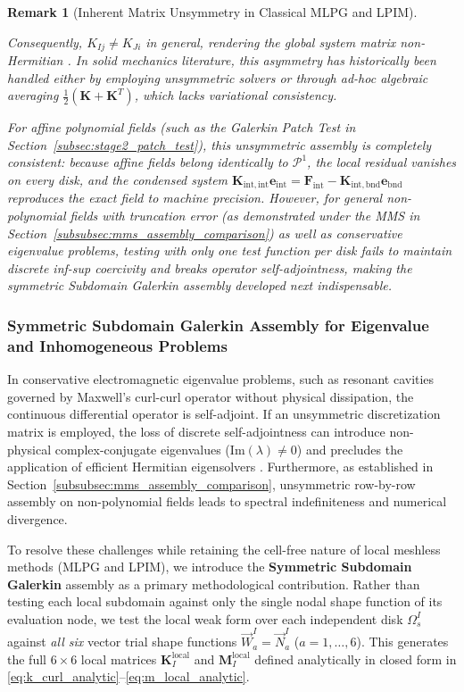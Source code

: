 \documentclass[preprint,12pt]{elsarticle}
\newtheorem{remark}{Remark}
\begin{document}
\begin{remark}[Inherent Matrix Unsymmetry in Classical MLPG and LPIM]
\begin{enumerate}
    \end{enumerate}
    Consequently, $K_{Ij} \ne K_{Ji}$ in general, rendering the global system matrix non-Hermitian \cite{atluri2002meshless, liu2001local}. In solid mechanics literature, this asymmetry has historically been handled either by employing unsymmetric solvers or through ad-hoc algebraic averaging $\frac{1}{2}(\mathbf{K} + \mathbf{K}^T)$, which lacks variational consistency.

    For affine polynomial fields (such as the Galerkin Patch Test in Section~\ref{subsec:stage2_patch_test}), this unsymmetric assembly is completely consistent: because affine fields belong identically to $\mathcal{P}^1$, the local residual vanishes on every disk, and the condensed system $\mathbf{K}_{\mathrm{int}, \mathrm{int}} \mathbf{e}_{\mathrm{int}} = \mathbf{F}_{\mathrm{int}} - \mathbf{K}_{\mathrm{int}, \mathrm{bnd}} \mathbf{e}_{\mathrm{bnd}}$ reproduces the exact field to machine precision. However, for general non-polynomial fields with truncation error (as demonstrated under the MMS in Section~\ref{subsubsec:mms_assembly_comparison}) as well as conservative eigenvalue problems, testing with only one test function per disk fails to maintain discrete inf-sup coercivity and breaks operator self-adjointness, making the symmetric Subdomain Galerkin assembly developed next indispensable.
\end{remark}

\subsubsection{Symmetric Subdomain Galerkin Assembly for Eigenvalue and Inhomogeneous Problems}
\label{subsubsec:symmetric_assembly}

In conservative electromagnetic eigenvalue problems, such as resonant cavities governed by Maxwell's curl-curl operator without physical dissipation, the continuous differential operator is self-adjoint. If an unsymmetric discretization matrix is employed, the loss of discrete self-adjointness can introduce non-physical complex-conjugate eigenvalues ($\mathrm{Im}(\lambda) \ne 0$) and precludes the application of efficient Hermitian eigensolvers \cite{saad2011numerical, boffi2013mixed}. Furthermore, as established in Section~\ref{subsubsec:mms_assembly_comparison}, unsymmetric row-by-row assembly on non-polynomial fields leads to spectral indefiniteness and numerical divergence.

To resolve these challenges while retaining the cell-free nature of local meshless methods (MLPG and LPIM), we introduce the \textbf{Symmetric Subdomain Galerkin} assembly as a primary methodological contribution. Rather than testing each local subdomain against only the single nodal shape function of its evaluation node, we test the local weak form over each independent disk $\Omega_s^I$ against \textit{all six} vector trial shape functions $\vec{W}_a^I = \vec{N}_a^I$ ($a=1,\dots,6$). This generates the full $6 \times 6$ local matrices $\mathbf{K}_I^{\mathrm{local}}$ and $\mathbf{M}_I^{\mathrm{local}}$ defined analytically in closed form in \eqref{eq:k_curl_analytic}--\eqref{eq:m_local_analytic}.
\end{document}
